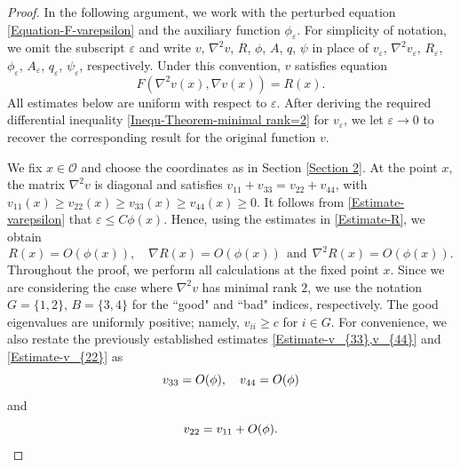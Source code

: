 \documentclass[11pt]{amsart}
\numberwithin{theorem}{section}
\numberwithin{equation}{section}
\begin{document}
\begin{proof}
In the following argument, we work with the perturbed equation \eqref{Equation-F-varepsilon} and the auxiliary function $\phi_\varepsilon$. For simplicity of notation, we omit the subscript $\varepsilon$ and write $v$, $\nabla^2v$, $R$, $\phi$, $A$, $q$, $\psi$ in place of $v_\varepsilon$, $\nabla^2v_\varepsilon$, $R_\varepsilon$, $\phi_\varepsilon$, $A_\varepsilon$, $q_\varepsilon$, $\psi_\varepsilon$, respectively. Under this convention, $v$ satisfies equation
\begin{equation}\label{Equation-minimal rank is 2}
F(\nabla^2v(x),\nabla v(x))=R(x).
\end{equation}
All estimates below are uniform with respect to $\varepsilon$. After deriving the required differential inequality \eqref{Inequ-Theorem-minimal rank=2} for $v_\varepsilon$, we let $\varepsilon\rightarrow 0$ to recover the corresponding result for the original function $v$.

We fix $x\in\mathcal{O}$ and choose the coordinates as in Section \ref{Section 2}. At the point $x$, the matrix $\nabla^2v$ is diagonal and satisfies $v_{11}+v_{33}=v_{22}+v_{44}$, with $v_{11}(x)\geq v_{22}(x)\geq v_{33}(x)\geq v_{44}(x)\geq 0$. It follows from \eqref{Estimate-varepsilon} that $\varepsilon\leq C\phi(x)$. Hence, using the estimates in \eqref{Estimate-R}, we obtain
\begin{equation}\label{Estimate-R1}
R(x)=O(\phi(x)),\quad \nabla R(x)=O(\phi(x))\ \ \mathrm{and}\ \ \nabla^2R(x)=O(\phi(x)).
\end{equation}
Throughout the proof, we perform all calculations at the fixed point $x$. Since we are considering the case where $\nabla^2v$ has minimal rank $2$, we use the notation $G=\{1,2\}$, $B=\{3,4\}$ for the “good" and “bad" indices, respectively. The good eigenvalues are uniformly positive; namely, $v_{ii}\geq c$ for $i\in G$. For convenience, we also restate the previously established estimates \eqref{Estimate-v_{33},v_{44}} and \eqref{Estimate-v_{22}} as
\begin{equation}\label{Estimate-v_{33},v_{44}'}
v_{33}=O(\phi),\quad v_{44}=O(\phi)
\end{equation}
and
\begin{equation}\label{Estimate-v_{22}'}
v_{22}=v_{11}+O(\phi).
\end{equation}



\end{proof}
\end{document}
